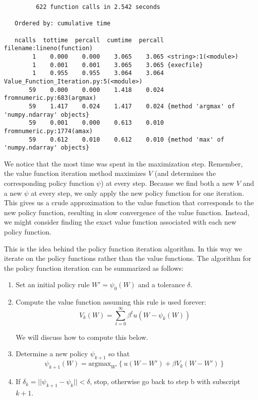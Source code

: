 \begin{lstlisting}[style=python]
%run -p -s cum Value_Function_Iteration.py
         622 function calls in 2.542 seconds

   Ordered by: cumulative time

   ncalls  tottime  percall  cumtime  percall filename:lineno(function)
        1    0.000    0.000    3.065    3.065 <string>:1(<module>)
        1    0.001    0.001    3.065    3.065 {execfile}
        1    0.955    0.955    3.064    3.064 Value_Function_Iteration.py:5(<module>)
       59    0.000    0.000    1.418    0.024 fromnumeric.py:683(argmax)
       59    1.417    0.024    1.417    0.024 {method 'argmax' of 'numpy.ndarray' objects}
       59    0.001    0.000    0.613    0.010 fromnumeric.py:1774(amax)
       59    0.612    0.010    0.612    0.010 {method 'max' of 'numpy.ndarray' objects}
\end{lstlisting}

We notice that the most time was spent in the maximization step.  Remember, the value function iteration method maximizes $V$ (and determines the corresponding policy function $\psi$) at every step.  Because we find both a new $V$ and a new $\psi$ at every step, we only apply the new policy function for one iteration.  This gives us a crude approximation to the value function that corresponds to the new policy function, resulting in slow convergence of the value function.  Instead, we might consider finding the exact value function associated with each new policy function.

This is the idea behind the policy function iteration algorithm.  In this way we iterate on the policy functions rather than the value functions.  The algorithm for the policy function iteration can be summarized as follows:

\begin{enumerate}
	\item Set an initial policy rule $W' = \psi_0(W)$ and a tolerance $\delta$.
	
	\item Compute the value function assuming this rule is used forever:
\begin{equation}
V_k(W) = \sum_{t=0}^\infty \beta^t u(W-\psi_k(W))
\end{equation}

    We will discuss how to compute this below.

	\item Determine a new policy $\psi_{k+1}$ so that
	\begin{equation}
		\psi_{k+1}(W) = \text{argmax}_{W'}\left\{ u(W-W') + \beta V_k(W-W') \right\}
	\end{equation}
	
	\item If $\delta_k = ||\psi_{k+1} - \psi_k|| < \delta$, stop, otherwise go back to step b with subscript $k+1$.
\end{enumerate}

